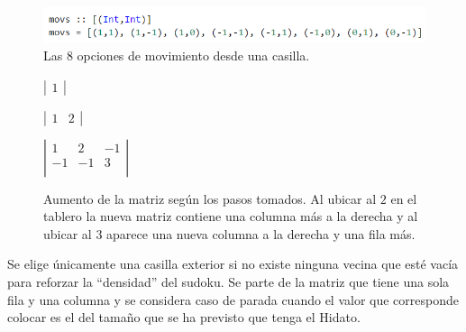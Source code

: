 \documentclass{llncs}
\begin{document}
\begin{figure}
\begin{center}
\includegraphics[width= 1\columnwidth]{figuras/movs}
\end{center}
\caption{Las 8 opciones de movimiento desde una casilla.}
\label{movs}
\end{figure}


\begin{figure}
\begin{center}
$\left| 
\begin{array}{r}
1
\end{array} 
\right|$
\end{center}

\begin{center}
$\left| 
\begin{array}{rr}
1 & 2
\end{array} 
\right|$
\end{center}

\begin{center}
$\left| 
\begin{array}{rrr}
1 & 2 & -1 \\
-1 & -1 & 3 \\
\end{array} 
\right|$
\end{center}
\caption{Aumento de la matriz seg\'un los pasos tomados. Al ubicar al $2$ en el tablero la nueva matriz contiene una columna m\'as a la derecha y al ubicar al $3$ aparece una nueva columna a la derecha y una fila m\'as.}
\label{camino}
\end{figure}

Se elige \'unicamente una casilla exterior si no existe ninguna vecina que est\'e vac\'ia para reforzar la ``densidad'' del sudoku. Se parte de la matriz que tiene una sola fila y una columna y se considera caso de parada cuando el valor que corresponde colocar es el del tama\~no que se ha previsto que tenga el Hidato.
\end{document}
